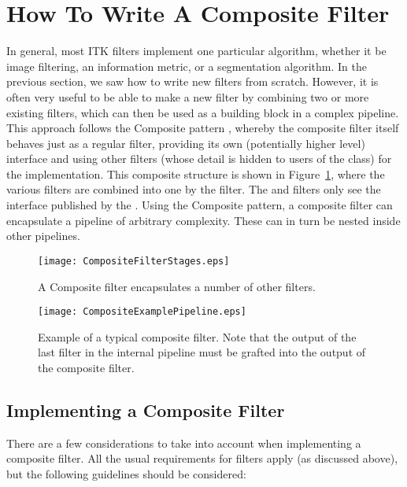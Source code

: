 
\section{How To Write A Composite Filter}

In general, most ITK filters implement one particular algorithm, whether it be
image filtering, an information metric, or a segmentation algorithm.  In the
previous section, we saw how to write new filters from scratch.  However, it is
often very useful to be able to make a new filter by combining two or more
existing filters, which can then be used as a building block in a complex
pipeline.  This approach follows the Composite pattern \cite{Gamma1995},
whereby the composite filter itself behaves just as a regular filter, providing
its own (potentially higher level) interface and using other filters (whose
detail is hidden to users of the class) for the implementation.  This composite
structure is shown in Figure~\ref{fig:CompositeFilterStages}, where the various
 filters are combined into one by the  filter.
The  and  filters only see the interface published by
the .  Using the Composite pattern, a composite filter can
encapsulate a pipeline of arbitrary complexity.  These can in turn be nested
inside other pipelines.

\begin{figure}
  \centering
  \texttt{[image: CompositeFilterStages.eps]}
  \caption{A Composite filter encapsulates a number of other filters.} 
  \label{fig:CompositeFilterStages}
\end{figure}

\begin{figure}
  \centering
  \texttt{[image: CompositeExamplePipeline.eps]}
  \caption{Example of a typical composite filter. Note that the output of the last filter in the internal pipeline must be grafted into the output of the composite filter.} 
  \label{fig:CompositeExamplePipeline}
\end{figure}


\subsection{Implementing a Composite Filter}

There are a few considerations to take into account when implementing a
composite filter.  All the usual requirements for filters apply (as
discussed above), but the following guidelines should be considered:

